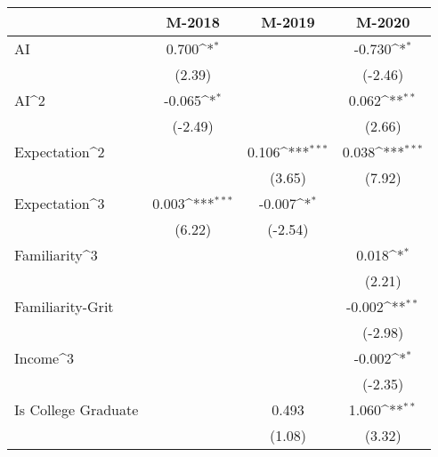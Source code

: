 {
\def\sym#1{\ifmmode^{#1}\else\(^{#1}\)\fi}
\begin{tabular}{l*{3}{c}}
    \toprule
                        & M-2018         & M-2019         & M-2020                                 \\
    \midrule
    AI                  & 0.700\sym{*}   &                & -0.730\sym{*}                          \\
                        & (2.39)         &                & (-2.46)                                \\
    \addlinespace
    AI^2                & -0.065\sym{*}  &                & 0.062\sym{**}                          \\
                        & (-2.49)        &                & (2.66)                                 \\
    \addlinespace
    Expectation^2       &                & 0.106\sym{***} & 0.038\sym{***}                         \\
                        &                & (3.65)         & (7.92)                                 \\
    \addlinespace
    Expectation^3       & 0.003\sym{***} & -0.007\sym{*}  &                                        \\
                        & (6.22)         & (-2.54)        &                                        \\
    \addlinespace
    Familiarity^3       &                &                & 0.018\sym{*}                           \\
                        &                &                & (2.21)                                 \\
    \addlinespace
    Familiarity-Grit    &                &                & -0.002\sym{**}                         \\
                        &                &                & (-2.98)                                \\
    \addlinespace
    Income^3            &                &                & -0.002\sym{*}                          \\
                        &                &                & (-2.35)                                \\
    \addlinespace
    Is College Graduate &                & 0.493          & 1.060\sym{**}                          \\
                        &                & (1.08)         & (3.32)                                 \\

\end{tabular}}
